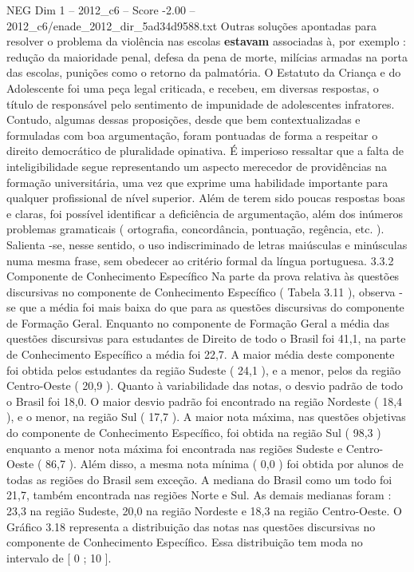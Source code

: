 \begin{textsample}{NEG Dim 1 – 2012\_c6 – Score -2.00 – 2012\_c6/enade\_2012\_dir\_5ad34d9588.txt}
Outras soluções apontadas para resolver o problema da violência nas escolas \textbf{estavam} associadas à, por exemplo : redução da maioridade penal, defesa da pena de morte, milícias armadas na porta das escolas, punições como o retorno da palmatória.
O Estatuto da Criança e do Adolescente foi uma peça legal criticada, e recebeu, em diversas respostas, o título de responsável pelo sentimento de impunidade de adolescentes infratores.
Contudo, algumas dessas proposições, desde que bem contextualizadas e formuladas com boa argumentação, foram pontuadas de forma a respeitar o direito democrático de pluralidade opinativa.
É imperioso ressaltar que a falta de inteligibilidade segue representando um aspecto merecedor de providências na formação universitária, uma vez que exprime uma habilidade importante para qualquer profissional de nível superior.
Além de terem sido poucas respostas boas e claras, foi possível identificar a deficiência de argumentação, além dos inúmeros problemas gramaticais ( ortografia, concordância, pontuação, regência, etc. ).
Salienta -se, nesse sentido, o uso indiscriminado de letras maiúsculas e minúsculas numa mesma frase, sem obedecer ao critério formal da língua portuguesa. 3.3.2 Componente de Conhecimento Específico Na parte da prova relativa às questões discursivas no componente de Conhecimento Específico ( Tabela 3.11 ), observa -se que a média foi mais baixa do que para as questões discursivas do componente de Formação Geral.
Enquanto no componente de Formação Geral a média das questões discursivas para estudantes de Direito de todo o Brasil foi 41,1, na parte de Conhecimento Específico a média foi 22,7.
A maior média deste componente foi obtida pelos estudantes da região Sudeste ( 24,1 ), e a menor, pelos da região Centro-Oeste ( 20,9 ).
Quanto à variabilidade das notas, o desvio padrão de todo o Brasil foi 18,0.
O maior desvio padrão foi encontrado na região Nordeste ( 18,4 ), e o menor, na região Sul ( 17,7 ).
A maior nota máxima, nas questões objetivas do componente de Conhecimento Específico, foi obtida na região Sul ( 98,3 ) enquanto a menor nota máxima foi encontrada nas regiões Sudeste e Centro-Oeste ( 86,7 ).
Além disso, a mesma nota mínima ( 0,0 ) foi obtida por alunos de todas as regiões do Brasil sem exceção.
A mediana do Brasil como um todo foi 21,7, também encontrada nas regiões Norte e Sul.
As demais medianas foram : 23,3 na região Sudeste, 20,0 na região Nordeste e 18,3 na região Centro-Oeste.
O Gráfico 3.18 representa a distribuição das notas nas questões discursivas no componente de Conhecimento Específico.
Essa distribuição tem moda no intervalo de [ 0 ; 10 ].

\end{textsample}

